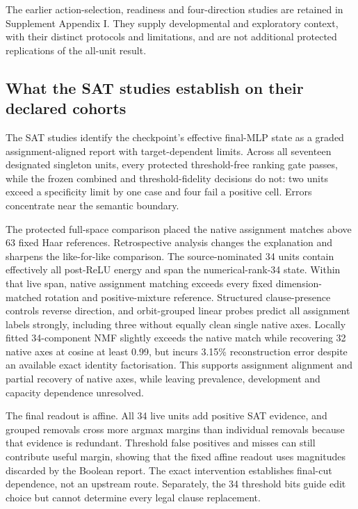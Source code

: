\documentclass[
  british,
  11pt,
  a4paper,
]{article}
\begin{document}
The earlier action-selection, readiness and four-direction studies are
retained in Supplement Appendix I. They supply developmental and
exploratory context, with their distinct protocols and limitations, and
are not additional protected replications of the all-unit result.

\subsection{What the SAT studies establish on their declared
cohorts}\label{what-the-sat-studies-establish-on-their-declared-cohorts}

The SAT studies identify the checkpoint's effective final-MLP state as a
graded assignment-aligned report with target-dependent limits. Across
all seventeen designated singleton units, every protected threshold-free
ranking gate passes, while the frozen combined and threshold-fidelity
decisions do not: two units exceed a specificity limit by one case and
four fail a positive cell. Errors concentrate near the semantic
boundary.

The protected full-space comparison placed the native assignment matches
above 63 fixed Haar references. Retrospective analysis changes the
explanation and sharpens the like-for-like comparison. The
source-nominated 34 units contain effectively all post-ReLU energy and
span the numerical-rank-34 state. Within that live span, native
assignment matching exceeds every fixed dimension-matched rotation and
positive-mixture reference. Structured clause-presence controls reverse
direction, and orbit-grouped linear probes predict all assignment labels
strongly, including three without equally clean single native axes.
Locally fitted 34-component NMF slightly exceeds the native match while
recovering 32 native axes at cosine at least 0.99, but incurs 3.15\%
reconstruction error despite an available exact identity factorisation.
This supports assignment alignment and partial recovery of native axes,
while leaving prevalence, development and capacity dependence
unresolved.

The final readout is affine. All 34 live units add positive SAT
evidence, and grouped removals cross more argmax margins than individual
removals because that evidence is redundant. Threshold false positives
and misses can still contribute useful margin, showing that the fixed
affine readout uses magnitudes discarded by the Boolean report. The
exact intervention establishes final-cut dependence, not an upstream
route. Separately, the 34 threshold bits guide edit choice but cannot
determine every legal clause replacement.
\end{document}
